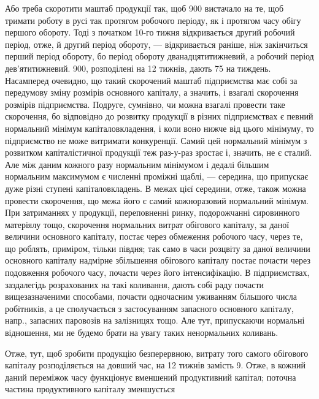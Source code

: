 Або треба скоротити маштаб продукції так, щоб 900 вистачало
на те, щоб тримати роботу в русі так протягом робочого періоду,
як і протягом часу обігу першого обороту. Тоді з початком
10-го тижня відкривається другий робочий період, отже, й другий період
обороту, — відкривається раніше, ніж закінчиться перший період обороту,
бо період обороту дванадцятитижневий, а робочий період дев’ятитижневий.
900, розподілені на 12 тижнів, дають 75 на тиждень.
Насамперед очевидно, що такий скорочений маштаб підприємства має
собі за передумову зміну розмірів основного капіталу, а значить, і взагалі
скорочення розмірів підприємства. Подруге, сумнівно, чи можна взагалі
провести таке скорочення, бо відповідно до розвитку продукції в різних
підприємствах є певний нормальний мінімум капіталовкладення, і коли
воно нижче від цього мінімуму, то підприємство не може витримати конкуренції.
Самий цей нормальний мінімум з розвитком капіталістичної
продукції теж раз-у-раз зростає і, значить, не є сталий. Але між даним
кожного разу нормальним мінімумом і дедалі більшим нормальним максимумом
є численні проміжні щаблі, — середина, що припускає дуже різні ступені
капіталовкладень. В межах цієї середини, отже, також можна провести
скорочення, що межа його є самий кожноразовий нормальний мінімум.
При затриманнях у продукції, переповненні ринку, подорожчанні сировинного
матеріялу тощо, скорочення нормальних витрат обігового капіталу,
за даної величини основного капіталу, постає через обмеження
робочого часу, через те, що роблять, приміром, тільки півдня; так само
в часи розцвіту за даної величини основного капіталу надмірне збільшення
обігового капіталу постає почасти через подовження робочого часу,
почасти через його інтенсифікацію. В підприємствах, заздалегідь розрахованих
на такі коливання, дають собі раду почасти вищезазначеними
способами, почасти одночасним уживанням більшого числа робітників,
а це сполучається з застосуванням запасного основного капіталу, напр.,
запасних паровозів на залізницях тощо. Але тут, припускаючи нормальні
відношення, ми не будемо брати на увагу таких ненормальних коливань.

Отже, тут, щоб зробити продукцію безперервною, витрату того самого
обігового капіталу розподіляється на довший час, на 12 тижнів замість 9.
Отже, в кожний даний переміжок часу функціонує вменшений продуктивний
капітал; поточна частина продуктивного капіталу зменшується
\parbreak{}  %
